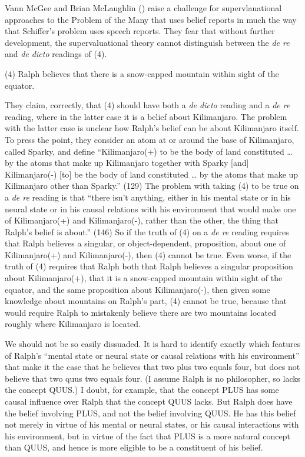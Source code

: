 \documentclass[
  10pt,
  letterpaper,
  DIV=11,
  numbers=noendperiod,
  twoside]{scrartcl}
\begin{document}
Vann McGee and Brian McLaughlin () raise a
challenge for supervlauational approaches to the Problem of the Many
that uses belief reports in much the way that Schiffer's problem uses
speech reports. They fear that without further development, the
supervaluational theory cannot distinguish between the \emph{de re} and
\emph{de dicto} readings of (4).

(4) Ralph believes that there is a snow-capped mountain within sight of
the equator.

They claim, correctly, that (4) should have both a \emph{de dicto}
reading and a \emph{de re} reading, where in the latter case it is a
belief about Kilimanjaro. The problem with the latter case is unclear
how Ralph's belief can be about Kilimanjaro itself. To press the point,
they consider an atom at or around the base of Kilimanjaro, called
Sparky, and define ``Kilimanjaro(+) to be the body of land constituted
\ldots{} by the atoms that make up Kilimanjaro together with Sparky
{[}and{]} Kilimanjaro(-) {[}to{]} be the body of land constituted
\ldots{} by the atoms that make up Kilimanjaro other than Sparky.''
(129) The problem with taking (4) to be true on a \emph{de re} reading
is that ``there isn't anything, either in his mental state or in his
neural state or in his causal relations with his environment that would
make one of Kilimanjaro(+) and Kilimanjaro(-), rather than the other,
the thing that Ralph's belief is about.'' (146) So if the truth of (4)
on a \emph{de re} reading requires that Ralph believes a singular, or
object-dependent, proposition, about one of Kilimanjaro(+) and
Kilimanjaro(-), then (4) cannot be true. Even worse, if the truth of (4)
requires that Ralph both that Ralph believes a singular proposition
about Kilimanjaro(+), that it is a snow-capped mountain within sight of
the equator, and the same proposition about Kilimanjaro(-), then given
some knowledge about mountains on Ralph's part, (4) cannot be true,
because that would require Ralph to mistakenly believe there are two
mountains located roughly where Kilimanjaro is located.

We should not be so easily dissuaded. It is hard to identify exactly
which features of Ralph's ``mental state or neural state or causal
relations with his environment'' that make it the case that he believes
that two plus two equals four, but does not believe that two quus two
equals four. (I assume Ralph is no philosopher, so lacks the concept
QUUS.) I doubt, for example, that the concept PLUS has some causal
influence over Ralph that the concept QUUS lacks. But Ralph does have
the belief involving PLUS, and not the belief involving QUUS. He has
this belief not merely in virtue of his mental or neural states, or his
causal interactions with his environment, but in virtue of the fact that
PLUS is a more natural concept than QUUS, and hence is more eligible to
be a constituent of his belief.
\end{document}
